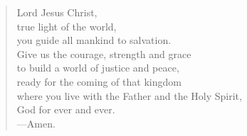 \prayer

\setlength{\vleftmargin}{\prayerleftmargini}

\begin{verse}
Lord Jesus Christ,\\
true light of the world,\\
you guide all mankind to salvation.\\
Give us the courage, strength and grace\\
to build a world of justice and peace,\\
ready for the coming of that kingdom\\
where you live with the Father and the Holy Spirit,\\
God for ever and ever.\\
{\color{red}---\thinspace}Amen.
\end{verse}

\setlength{\vleftmargin}{\defleftmargini}